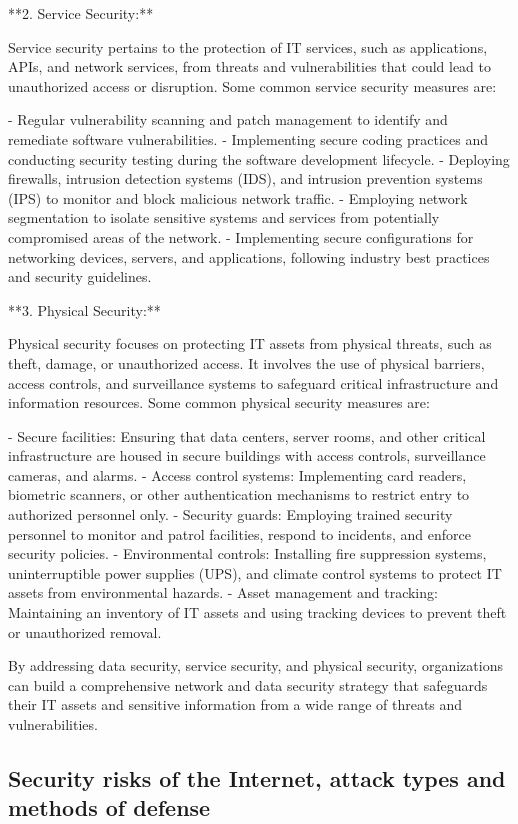 \documentclass{article}
\begin{document}
**2. Service Security:**

Service security pertains to the protection of IT services, such as applications, APIs, and network services, from threats and vulnerabilities that could lead to unauthorized access or disruption. Some common service security measures are:

- Regular vulnerability scanning and patch management to identify and remediate software vulnerabilities.
- Implementing secure coding practices and conducting security testing during the software development lifecycle.
- Deploying firewalls, intrusion detection systems (IDS), and intrusion prevention systems (IPS) to monitor and block malicious network traffic.
- Employing network segmentation to isolate sensitive systems and services from potentially compromised areas of the network.
- Implementing secure configurations for networking devices, servers, and applications, following industry best practices and security guidelines.

**3. Physical Security:**

Physical security focuses on protecting IT assets from physical threats, such as theft, damage, or unauthorized access. It involves the use of physical barriers, access controls, and surveillance systems to safeguard critical infrastructure and information resources. Some common physical security measures are:

- Secure facilities: Ensuring that data centers, server rooms, and other critical infrastructure are housed in secure buildings with access controls, surveillance cameras, and alarms.
- Access control systems: Implementing card readers, biometric scanners, or other authentication mechanisms to restrict entry to authorized personnel only.
- Security guards: Employing trained security personnel to monitor and patrol facilities, respond to incidents, and enforce security policies.
- Environmental controls: Installing fire suppression systems, uninterruptible power supplies (UPS), and climate control systems to protect IT assets from environmental hazards.
- Asset management and tracking: Maintaining an inventory of IT assets and using tracking devices to prevent theft or unauthorized removal.

By addressing data security, service security, and physical security, organizations can build a comprehensive network and data security strategy that safeguards their IT assets and sensitive information from a wide range of threats and vulnerabilities.


\subsection{Security risks of the Internet, attack types and methods of defense}
\end{document}
